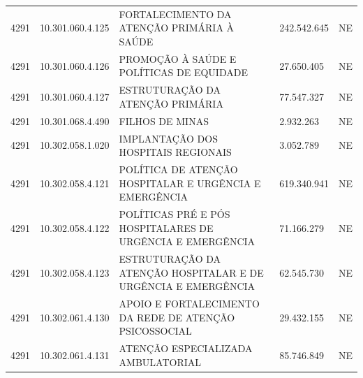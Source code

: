 \documentclass{article}
\begin{document}
\begin{longtable}[c]{m{1cm}|m{2cm}|m{10cm}|m{2cm}|m{1cm}}
\multicolumn{1}{C{1cm}|}{4291} & \multicolumn{1}{C{2cm}|}{10.301.060.4.125} & \multicolumn{1}{L{10cm}|}{FORTALECIMENTO DA ATENÇÃO PRIMÁRIA À SAÚDE} & \multicolumn{1}{R{2cm}|}{242.542.645} & \multicolumn{1}{C{1cm}}{NE} \\
\multicolumn{1}{C{1cm}|}{4291} & \multicolumn{1}{C{2cm}|}{10.301.060.4.126} & \multicolumn{1}{L{10cm}|}{PROMOÇÃO À SAÚDE E POLÍTICAS DE EQUIDADE} & \multicolumn{1}{R{2cm}|}{27.650.405} & \multicolumn{1}{C{1cm}}{NE} \\
\multicolumn{1}{C{1cm}|}{4291} & \multicolumn{1}{C{2cm}|}{10.301.060.4.127} & \multicolumn{1}{L{10cm}|}{ESTRUTURAÇÃO DA ATENÇÃO PRIMÁRIA} & \multicolumn{1}{R{2cm}|}{77.547.327} & \multicolumn{1}{C{1cm}}{NE} \\
\multicolumn{1}{C{1cm}|}{4291} & \multicolumn{1}{C{2cm}|}{10.301.068.4.490} & \multicolumn{1}{L{10cm}|}{FILHOS DE MINAS} & \multicolumn{1}{R{2cm}|}{2.932.263} & \multicolumn{1}{C{1cm}}{NE} \\
\multicolumn{1}{C{1cm}|}{4291} & \multicolumn{1}{C{2cm}|}{10.302.058.1.020} & \multicolumn{1}{L{10cm}|}{IMPLANTAÇÃO DOS HOSPITAIS REGIONAIS} & \multicolumn{1}{R{2cm}|}{3.052.789} & \multicolumn{1}{C{1cm}}{NE} \\
\multicolumn{1}{C{1cm}|}{4291} & \multicolumn{1}{C{2cm}|}{10.302.058.4.121} & \multicolumn{1}{L{10cm}|}{POLÍTICA DE ATENÇÃO HOSPITALAR E URGÊNCIA E EMERGÊNCIA} & \multicolumn{1}{R{2cm}|}{619.340.941} & \multicolumn{1}{C{1cm}}{NE} \\
\multicolumn{1}{C{1cm}|}{4291} & \multicolumn{1}{C{2cm}|}{10.302.058.4.122} & \multicolumn{1}{L{10cm}|}{POLÍTICAS PRÉ E PÓS HOSPITALARES DE URGÊNCIA E EMERGÊNCIA} & \multicolumn{1}{R{2cm}|}{71.166.279} & \multicolumn{1}{C{1cm}}{NE} \\
\multicolumn{1}{C{1cm}|}{4291} & \multicolumn{1}{C{2cm}|}{10.302.058.4.123} & \multicolumn{1}{L{10cm}|}{ESTRUTURAÇÃO DA ATENÇÃO HOSPITALAR E DE URGÊNCIA E EMERGÊNCIA} & \multicolumn{1}{R{2cm}|}{62.545.730} & \multicolumn{1}{C{1cm}}{NE} \\
\multicolumn{1}{C{1cm}|}{4291} & \multicolumn{1}{C{2cm}|}{10.302.061.4.130} & \multicolumn{1}{L{10cm}|}{APOIO E FORTALECIMENTO DA REDE DE ATENÇÃO PSICOSSOCIAL} & \multicolumn{1}{R{2cm}|}{29.432.155} & \multicolumn{1}{C{1cm}}{NE} \\
\multicolumn{1}{C{1cm}|}{4291} & \multicolumn{1}{C{2cm}|}{10.302.061.4.131} & \multicolumn{1}{L{10cm}|}{ATENÇÃO ESPECIALIZADA AMBULATORIAL} & \multicolumn{1}{R{2cm}|}{85.746.849} & \multicolumn{1}{C{1cm}}{NE} \\

\end{longtable}
\end{document}
